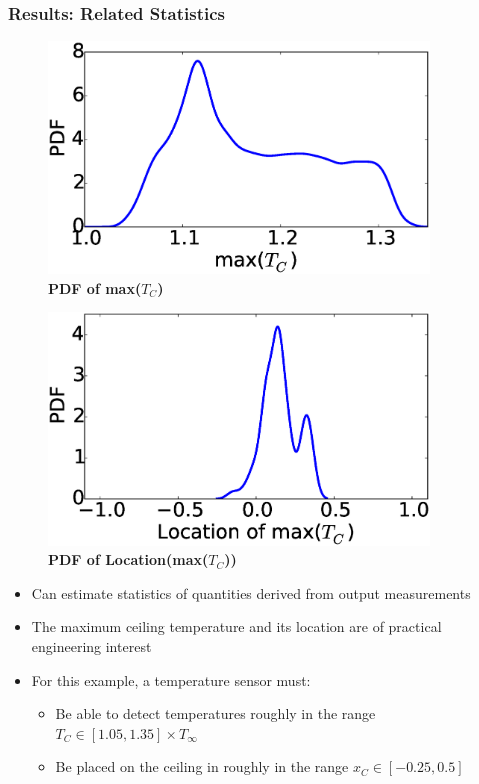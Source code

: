 \documentclass[9pt]{beamer}
\begin{document}
\begin{frame}
\frametitle{Results: Related Statistics}
\label{sec-5-6}


\centering
\begin{minipage}[b]{0.45\linewidth}
\begin{figure}[ht]
\includegraphics[width=0.9\textwidth]{maxCeilingTempDistribution} \\
\textbf{PDF of max($T_C$)}
\end{figure}
\end{minipage}
\begin{minipage}[b]{0.45\linewidth}
\begin{figure}[ht]
\includegraphics[width=0.9\textwidth]{maxCeilingTempLocationDistribution} \\
\textbf{PDF of Location(max($T_C$))}
\end{figure}
\end{minipage}

\begin{itemize}
\item Can estimate statistics of quantities derived from output measurements
\item The maximum ceiling temperature and its location are of practical engineering interest
\item For this example, a temperature sensor must:
\begin{itemize}
\item Be able to detect temperatures roughly in the range $T_C \in [1.05,1.35] \times T_{\infty}$
\item Be placed on the ceiling in roughly in the range $x_C \in [-0.25, 0.5]$
\end{itemize}
\end{itemize}
\end{frame}
\end{document}
